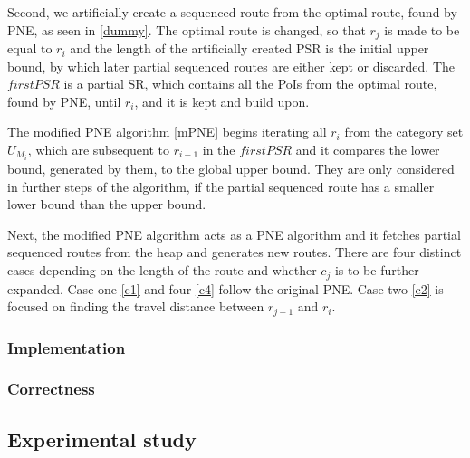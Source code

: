 Second, we artificially create a sequenced route from the optimal route, found by PNE, as seen in \ref{dummy}. The optimal route is changed, so that $r_j$ is made to be equal to $r_i$ and the length of the artificially created PSR is the initial upper bound, by which later partial sequenced routes are either kept or discarded. The $firstPSR$ is a partial SR, which contains all the PoIs from the optimal route, found by PNE, until $r_i$, and it is kept and build upon.

The modified PNE algorithm \ref{mPNE} begins iterating all $r_i$ from the category set $U_{M_i}$, which are subsequent to $r_{i-1}$ in the $firstPSR$ and it compares the lower bound, generated by them, to the global upper bound. They are only considered in further steps of the algorithm, if the partial sequenced route has a smaller lower bound than the upper bound.

Next, the modified PNE algorithm acts as a PNE algorithm and it fetches partial sequenced routes from the heap and generates new routes. There are four distinct cases depending on the length of the route and whether $c_j$ is to be further expanded. Case one \ref{c1} and four \ref{c4} follow the original PNE. Case two \ref{c2} is focused on finding the travel distance between $r_{j-1}$ and $r_i$.

\subsubsection{Implementation}
\label{sec:implementation}

\subsubsection{Correctness}
\label{sec:correctness}

\subsection{Experimental study}
\label{sec:experiments}




